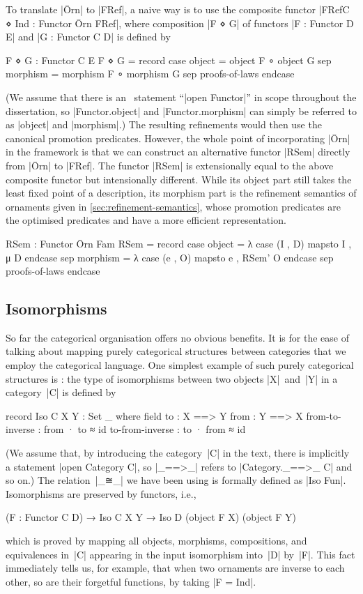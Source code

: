 To translate |Ōrn| to |FRef|, a naive way is to use the composite functor |FRefC ⋄ Ind : Functor Ōrn FRef|, where composition |F ⋄ G| of functors |F : Functor D E| and |G : Functor C D| is defined by
\begin{code}
F ⋄ G : Functor C E
F ⋄ G = record  case  object    = object F ∘ object G
                sep   morphism  = morphism F ∘ morphism G
                sep   proofs-of-laws endcase
\end{code}
(We assume that there is an \Agda\ statement ``|open Functor|'' in scope throughout the dissertation, so |Functor.object| and |Functor.morphism| can simply be referred to as |object| and |morphism|.)
The resulting refinements would then use the canonical promotion predicates.
However, the whole point of incorporating |Ōrn| in the framework is that we can construct an alternative functor |RSem| directly from |Ōrn| to |FRef|.
The functor |RSem| is extensionally equal to the above composite functor but intensionally different.
While its object part still takes the least fixed point of a description, its morphism part is the refinement semantics of ornaments given in \autoref{sec:refinement-semantics}, whose promotion predicates are the optimised predicates and have a more efficient representation.
\begin{code}
RSem : Functor Ōrn Fam
RSem = record  case  object    =  λ case (I , D) mapsto I , μ D      endcase
               sep   morphism  =  λ case (e , O) mapsto e , RSem' O  endcase
               sep   proofs-of-laws endcase
\end{code}

\subsection{Isomorphisms}
\label{sec:isomorphisms}

So far the categorical organisation offers no obvious benefits.
It is for the ease of talking about mapping purely categorical structures between categories that we employ the categorical language.
One simplest example of such purely categorical structures is : the type of isomorphisms between two objects |X|~and~|Y| in a category~|C| is defined by
\begin{code}
record Iso C X Y : Set _ where
  field
    to    : X ==> Y
    from  : Y ==> X
    from-to-inverse  : from · to ≈ id
    to-from-inverse  : to · from ≈ id
\end{code}
(We assume that, by introducing the category~|C| in the text, there is implicitly a statement |open Category C|, so |_==>_| refers to |Category._==>_ C| and so on.)
The relation~|_≅_| we have been using is formally defined as |Iso Fun|.
Isomorphisms are preserved by functors, i.e.,
\begin{code}
(F : Functor C D) → Iso C X Y → Iso D (object F X) (object F Y)
\end{code}
which is proved by mapping all objects, morphisms, compositions, and equivalences in~|C| appearing in the input isomorphism into~|D| by~|F|.
This fact immediately tells us, for example, that when two ornaments are inverse to each other, so are their forgetful functions, by taking |F = Ind|.

